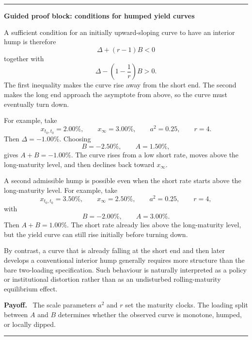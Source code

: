 \documentclass[11pt]{article}
\theoremstyle{plainbreak}
\newenvironment{proofblock}[1]{%
    \vspace{0.5em}\hrule\vspace{0.7em}%
    {\bfseries Guided proof block: #1}\par\vspace{0.2em}%
}{%
    \vspace{0.5em}\hrule\vspace{0.7em}%
}
\newenvironment{takeaway}{%
    \vspace{0.4em}\noindent\textbf{Payoff.}\ }{\par\vspace{0.4em}}
\begin{document}
\begin{proofblock}{conditions for humped yield curves}
A sufficient condition for an initially upward-sloping curve to have an interior hump is therefore
\begin{equation*}
    \Delta+(r-1)B<0
\end{equation*}
together with
\begin{equation*}
    \Delta-\left(1-\frac{1}{r}\right)B>0.
\end{equation*}
The first inequality makes the curve rise away from the short end. The second makes the long end approach the asymptote from above, so the curve must eventually turn down.

For example, take
\begin{equation*}
    x_{t_0,t_0}=2.00\%,
    \qquad x_\infty=3.00\%,
    \qquad a^2=0.25,
    \qquad r=4.
\end{equation*}
Then \(\Delta=-1.00\%\). Choosing
\begin{equation*}
    B=-2.50\%,
    \qquad A=1.50\%,
\end{equation*}
gives \(A+B=-1.00\%\). The curve rises from a low short rate, moves above the long-maturity level, and then declines back toward \(x_\infty\).

A second admissible hump is possible even when the short rate starts above the long-maturity level. For example, take
\begin{equation*}
    x_{t_0,t_0}=3.50\%,
    \qquad x_\infty=2.50\%,
    \qquad a^2=0.25,
    \qquad r=4,
\end{equation*}
with
\begin{equation*}
    B=-2.00\%,
    \qquad A=3.00\%.
\end{equation*}
Then \(A+B=1.00\%\). The short rate already lies above the long-maturity level, but the yield curve can still rise initially before turning down.

By contrast, a curve that is already falling at the short end and then later develops a conventional interior hump generally requires more structure than the bare two-loading specification. Such behaviour is naturally interpreted as a policy or institutional distortion rather than as an undisturbed rolling-maturity equilibrium effect.

\begin{takeaway}
The scale parameters \(a^2\) and \(r\) set the maturity clocks. The loading split between \(A\) and \(B\) determines whether the observed curve is monotone, humped, or locally dipped.
\end{takeaway}
\end{proofblock}
\end{document}
